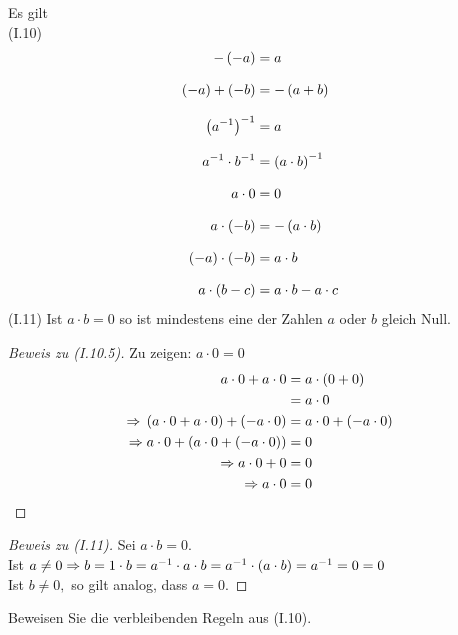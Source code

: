 \begin{satz}
    Es gilt\\
    (I.10)
    \begin{align}
        -\left(-a\right) &= a\\[8pt]
        \left(-a\right) + \left(-b\right) &= -\left(a+b\right)\\[8pt]
        \left(a^{-1}\right)^{-1} &= a\\[8pt]
        a^{-1}\cdot b^{-1} &= \left(a\cdot b\right)^{-1}\\[8pt]
        a\cdot 0 &= 0\\[8pt]
        a\cdot\left(-b\right) &= -\left(a\cdot b\right)\\[8pt]
        (-a)\cdot(-b) &= a\cdot b\\[8pt]
        a\cdot\left(b-c\right) &= a\cdot b - a\cdot c
    \end{align}
    \noindent (I.11) Ist $a\cdot b = 0$ so ist mindestens eine der Zahlen $a$ oder $b$ gleich Null.

    \begin{proof}[Beweis zu (I.10.5)]
        Zu zeigen: $a \cdot 0 = 0$
        \begin{align*}
            a\cdot 0 + a \cdot 0 &= a \cdot\left(0+0\right)\\
            &= a \cdot 0\\
            \Rightarrow{} \left(a\cdot 0 + a \cdot 0\right) + \left(-a \cdot 0\right) &= a \cdot 0 + \left(-a\cdot 0\right)\\
            \Rightarrow{} a \cdot 0 + \left(a\cdot 0 + \left(-a\cdot 0\right)\right) &= 0\\
            \Rightarrow{} a\cdot 0 +0 &= 0\\
            \Rightarrow{} a\cdot 0 &= 0\qedhere
        \end{align*}
    \end{proof}
    \begin{proof}[Beweis zu (I.11)]
        Sei $a\cdot b = 0$.\\
        Ist $a\neq 0 \Rightarrow{} b = 1\cdot b = a^{-1}\cdot a \cdot b = a^{-1}\cdot (a\cdot b) = a^{-1} = 0 = 0$\\
        Ist $b\neq 0,$ so gilt analog, dass $a = 0$.
    \end{proof}
    \begin{uebung}
        Beweisen Sie die verbleibenden Regeln aus (I.10).
    \end{uebung}
\end{satz}

